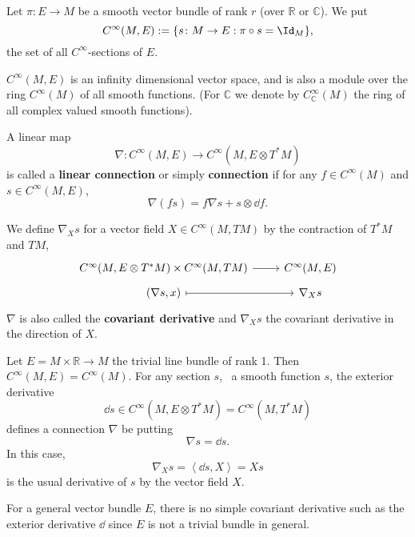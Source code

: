 \documentclass[12pt]{article}
\begin{document}
Let \(\pi\colon E\to M\) be a smooth vector bundle of rank \(r\) (over \(\mathbb{R}\)
or \(\mathbb{C}\)). We put \[
    C^\infty(M,E):=\{s\colon M\to E:\pi\circ s=\Id_M\}
,\] the set of all \(C^\infty\)-sections of \(E\).

\begin{center}

\end{center}

\(C^\infty(M,E)\) is an infinity
dimensional vector space, and is also a module over the ring \(C^\infty(M)\) of 
all smooth functions. (For \(\mathbb{C}\) we denote by \(C_{\mathbb{C}}^\infty(M)\) 
the ring of all complex valued smooth functions).

\begin{definition}
    A linear map \[
        \nabla\colon C^\infty(M,E)\longrightarrow C^\infty(M,E\otimes T^*M)
    \] is called a \textbf{linear connection} or simply \textbf{connection} if for
    any \(f\in C^\infty(M)\) and \(s \in C^\infty(M,E)\), \[
        \nabla (fs)=f\nabla s+s\otimes \dd{f}
    .\] 
\end{definition}
\begin{definition}
    We define \(\nabla_X s\) for a vector field \(X\in C^\infty(M,TM)\) by the
    contraction of \(T^*M\) and \(TM\),
    \[\begin{tikzcd}[row sep=tiny]
        C^\infty(M,E\otimes T^*M)\times C^\infty(M,TM) & C^\infty(M,E) \\
        (\nabla s,x) & \nabla_X s 
        \arrow[from=1-1, to=1-2]
        \arrow[maps to, from=2-1, to=2-2]
    \end{tikzcd}\]
    \(\nabla\) is also called the \textbf{covariant derivative} and \(\nabla_X s\) the
    covariant derivative in the direction of \(X\).
\end{definition}
\begin{example}
    Let \(E=M\times \mathbb{R}\to M\) the trivial line bundle of rank 1. Then
    \(C^\infty(M,E)=C^\infty(M)\). For any section \(s\), \ie\ a smooth function
    \(s\), the exterior derivative \[
        \dd{s}\in C^\infty(M,E\otimes T^*M)=C^\infty(M,T^*M)
    \] defines a connection \(\nabla\) be putting \[
        \nabla s=\dd{s}
    .\] In this case, \[
        \nabla_X s=\left<\dd{s},X\right> =Xs
    \] is the usual derivative of \(s\) by the vector field \(X\).
\end{example}

For a general vector bundle \(E\), there is no simple covariant
derivative such as the exterior derivative \(\dd\) since \(E\) is 
not a trivial bundle in general.
\end{document}
